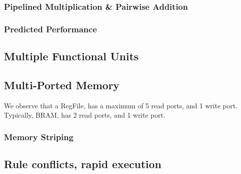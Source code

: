 \documentclass[a4paper,9pt]{report}
\begin{document}
\subsubsection{Pipelined Multiplication \& Pairwise Addition}
\subsubsection{Predicted Performance}


\subsection{Multiple Functional Units}


% 

\subsection{Multi-Ported Memory}

We observe that a RegFile, has a maximum of 5 read ports, and 1 write port.
Typically, BRAM, has 2 read ports, and 1 write port.


\subsubsection{Memory Striping}

\subsection{Rule conflicts, rapid execution}

\end{document}
